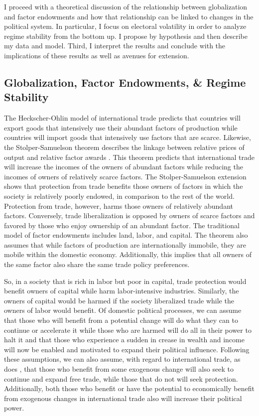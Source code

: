 \documentclass[12pt,letterpaper]{article}
\begin{document}
I proceed with a theoretical discussion of the relationship between globalization and factor endowments and how that relationship can be linked to changes in the political system. In particular, I focus on electoral volatility in order to analyze regime stability from the bottom up. I propose by hypothesis and then describe my data and model. Third, I interpret the results and conclude with the implications of these results as well as avenues for extension. 

\subsection*{Globalization, Factor Endowments, \& Regime Stability}
The Heckscher-Ohlin model of international trade predicts that countries will export goods that intensively use their abundant factors of production while countries will import goods that intensively use factors that are scarce. Likewise, the Stolper-Samuelson theorem describes the linkage between relative prices of output and relative factor awards \citep{StolperSamuelson1941}. This theorem predicts that international trade will increase the incomes of the owners of abundant factors while reducing the incomes of owners of relatively scarce factors. The Stolper-Samuelson extension shows that protection from trade benefits those owners of factors in which the society is relatively poorly endowed, in comparison to the rest of the world. Protection from trade, however, harms those owners of relatively abundant factors. Conversely, trade liberalization is opposed by owners of scarce factors and favored by those who enjoy ownership of an abundant factor. The traditional model of factor endowments includes land, labor, and capital. The theorem also assumes that while factors of production are internationally immobile, they are mobile within the domestic economy. Additionally, this implies that all owners of the same factor also share the same trade policy preferences. 

So, in a society that is rich in labor but poor in capital, trade protection would benefit owners of capital while harm labor-intensive industries. Similarly, the owners of capital would be harmed if the society liberalized trade while the owners of labor would benefit. Of domestic political processes, we can assume that those who will benefit from a potential change will do what they can to continue or accelerate it while those who are harmed will do all in their power to halt it and that those who experience a sudden in crease in wealth and income will now be enabled and motivated to expand their political influence. Following these assumptions, we can also assume, with regard to international trade, as does \citet{Rogowski1987}, that those who benefit from some exogenous change will also seek to continue and expand free trade, while those that do not will seek protection. Additionally, both those who benefit or have the potential to economically benefit from exogenous changes in international trade also will increase their political power. 
\end{document}
